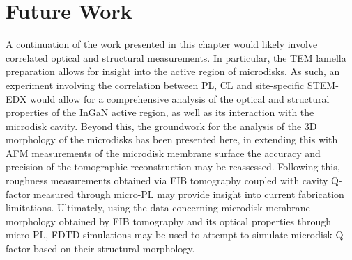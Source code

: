 \section{Future Work}
A continuation of the work presented in this chapter would likely involve correlated optical and structural measurements. In particular, the TEM lamella preparation allows for insight into the active region of microdisks. As such, an experiment involving the correlation between PL, CL and site-specific STEM-EDX would allow for a comprehensive analysis of the optical and structural properties of the InGaN active region, as well as its interaction with the microdisk cavity. Beyond this, the groundwork for the analysis of the 3D morphology of the microdisks has been presented here, in extending this with AFM measurements of the microdisk membrane surface the accuracy and precision of the tomographic reconstruction may be reassessed. Following this, roughness measurements obtained via FIB tomography coupled with cavity Q-factor measured through micro-PL may provide insight into current fabrication limitations. Ultimately, using the data concerning microdisk membrane morphology obtained by FIB tomography and its optical properties through micro PL, FDTD simulations may be used to attempt to simulate microdisk Q-factor based on their structural morphology.







